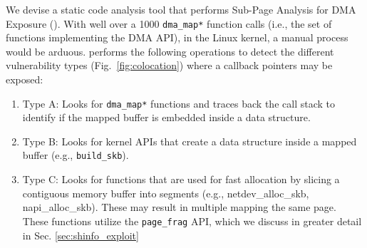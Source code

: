 We devise a static code analysis tool that performs Sub-Page Analysis for DMA Exposure (\tool). With well over a 1000 \texttt{dma\_map*} function calls (i.e., the set of functions implementing the DMA API), in the Linux kernel, a manual process would be arduous. \tool performs the following operations to detect the different \subpage{} vulnerability types (Fig.~\ref{fig:colocation}) where a callback pointers may be exposed:
\begin{enumerate}
    \item Type A: Looks for \texttt{dma\_map*} functions and traces back the call stack to identify if the mapped buffer is embedded inside a data structure.
    \item Type B: Looks for kernel APIs that create a data structure inside a mapped buffer (e.g., \texttt{build\_skb}).
    \item Type C: Looks for functions that are used for fast allocation by slicing a contiguous memory buffer into segments (e.g., netdev\_alloc\_skb, napi\_alloc\_skb). These may result in multiple \iova{} mapping the same page. These functions utilize the \texttt{page\_frag} API, which we discuss in greater detail in Sec. \ref{sec:shinfo_exploit} 
\end{enumerate}




